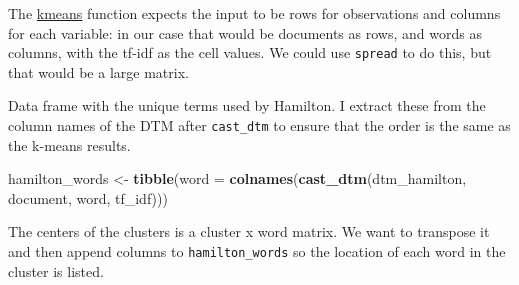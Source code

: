 \documentclass[]{book}
\newenvironment{Shaded}{\begin{snugshade}}{\end{snugshade}}
\newcommand{\KeywordTok}[1]{\textcolor[rgb]{0.13,0.29,0.53}{\textbf{#1}}}
\newcommand{\DataTypeTok}[1]{\textcolor[rgb]{0.13,0.29,0.53}{#1}}
\newcommand{\DecValTok}[1]{\textcolor[rgb]{0.00,0.00,0.81}{#1}}
\newcommand{\StringTok}[1]{\textcolor[rgb]{0.31,0.60,0.02}{#1}}
\newcommand{\CommentTok}[1]{\textcolor[rgb]{0.56,0.35,0.01}{\textit{#1}}}
\newcommand{\OperatorTok}[1]{\textcolor[rgb]{0.81,0.36,0.00}{\textbf{#1}}}
\newcommand{\NormalTok}[1]{#1}
\theoremstyle{definition}
\theoremstyle{definition}
\theoremstyle{definition}
\theoremstyle{remark}
\begin{document}
\begin{Shaded}
\end{Shaded}

The
\href{https://www.rdocumentation.org/packages/stats/topics/kmeans}{kmeans}
function expects the input to be rows for observations and columns for
each variable: in our case that would be documents as rows, and words as
columns, with the tf-idf as the cell values. We could use
\texttt{spread} to do this, but that would be a large matrix.

\begin{Shaded}
\end{Shaded}

Data frame with the unique terms used by Hamilton. I extract these from
the column names of the DTM after \texttt{cast\_dtm} to ensure that the
order is the same as the k-means results.

\begin{Shaded}
\begin{Highlighting}[]
\NormalTok{hamilton_words <-}
\StringTok{  }\KeywordTok{tibble}\NormalTok{(}\DataTypeTok{word =} \KeywordTok{colnames}\NormalTok{(}\KeywordTok{cast_dtm}\NormalTok{(dtm_hamilton, document, word, tf_idf)))}
\end{Highlighting}
\end{Shaded}

The centers of the clusters is a cluster x word matrix. We want to
transpose it and then append columns to \texttt{hamilton\_words} so the
location of each word in the cluster is listed.
\end{document}
